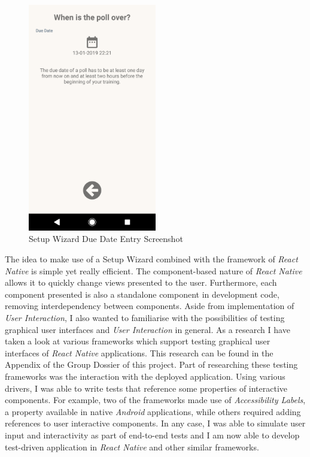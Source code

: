 \begin{figure}[H]
    \centering
    \includegraphics[width=0.5\textwidth]{images/wizard_due_date_screenshot.png}
    \caption{Setup Wizard Due Date Entry Screenshot}
    \label{fig:wizard_due_date_screenshot}
\end{figure}

The idea to make use of a Setup Wizard combined with the framework of \textit{React Native} is simple yet really efficient. The component-based nature of \textit{React Native} allows it to quickly change views presented to the user. Furthermore, each component presented is also a standalone component in development code, removing interdependency between components.
\newline
Aside from implementation of \textit{User Interaction}, I also wanted to familiarise with the possibilities of testing graphical user interfaces and \textit{User Interaction} in general. As a research I have taken a look at various frameworks which support testing graphical user interfaces of \textit{React Native} applications. This research can be found in the Appendix of the Group Dossier of this project.
\newline
Part of researching these testing frameworks was the interaction with the deployed application. Using various drivers, I was able to write tests that reference some properties of interactive components. For example, two of the frameworks made use of \textit{Accessibility Labels}, a property available in native \textit{Android} applications, while others required adding references to user interactive components. In any case, I was able to simulate user input and interactivity as part of end-to-end tests and I am now able to develop test-driven application in \textit{React Native} and other similar frameworks.

